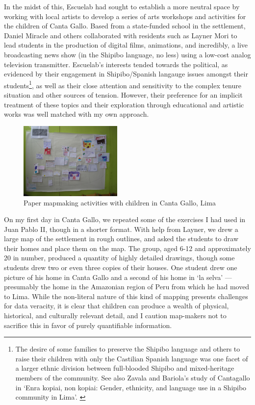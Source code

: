 \documentclass[11pt,oneside,notitlepage]{report}
\begin{document}
In the midst of this, Escuelab had sought to establish a more neutral space by working with local artists to develop a series of arts workshops and activities for the children of Canta Gallo. Based from a state-funded school in the settlement, Daniel Miracle and others collaborated with residents such as Layner Mori to lead students in the production of digital films, animations, and incredibly, a live broadcasting news show (in the Shipibo language, no less) using a low-cost analog television transmitter. Escuelab's interests tended towards the political, as evidenced by their engagement in Shipibo/Spanish langauge issues amongst their students\footnote{The desire of some families to preserve the Shipibo language and others to raise their children with only the Castilian Spanish language was one facet of a larger ethnic division between full-blooded Shipibo and mixed-heritage members of the community. See also Zavala and Bariola's study of Cantagallo in `Enra kopiai, non kopiai: Gender, ethnicity, and language use in a Shipibo community in Lima'. \cite{bariola2008gender}}, as well as their close attention and sensitivity to the complex tenure situation and other sources of tension. However, their preference for an implicit treatment of these topics and their exploration through educational and artistic works was well matched with my own approach.

\begin{figure}
	\begin{flushright}
		\includegraphics[width=0.45\textwidth]{images/canta-gallo-drawn-map.jpg}
		\caption{Paper mapmaking activities with children in Canta Gallo, Lima}
	\end{flushright}
\end{figure}

On my first day in Canta Gallo, we repeated some of the exercises I had used in Juan Pablo II, though in a shorter format. With help from Layner, we drew a large map of the settlement in rough outlines, and asked the students to draw their homes and place them on the map. The group, aged 6-12 and approximately 20 in number, produced a quantity of highly detailed drawings, though some students drew two or even three copies of their houses. One student drew one picture of his home in Canta Gallo and a second of his home in `la selva' --- presumably the home in the Amazonian region of Peru from which he had moved to Lima. While the non-literal nature of this kind of mapping presents challenges for data veracity, it is clear that children can produce a wealth of physical, historical, and culturally relevant detail, and I caution map-makers not to sacrifice this in favor of purely quantifiable information. 
\end{document}
